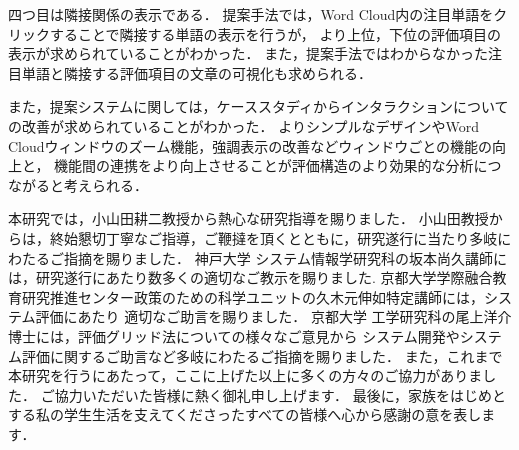 \documentclass[syuuron]{kuee}
\begin{document}
		四つ目は隣接関係の表示である．
		提案手法では，Word Cloud内の注目単語をクリックすることで隣接する単語の表示を行うが，
		より上位，下位の評価項目の表示が求められていることがわかった．
		また，提案手法ではわからなかった注目単語と隣接する評価項目の文章の可視化も求められる．
		
		また，提案システムに関しては，ケーススタディからインタラクションについての改善が求められていることがわかった．
		よりシンプルなデザインやWord Cloudウィンドウのズーム機能，強調表示の改善などウィンドウごとの機能の向上と，
		機能間の連携をより向上させることが評価構造のより効果的な分析につながると考えられる．

\begin{acknowledgements}
	本研究では，小山田耕二教授から熱心な研究指導を賜りました．
	小山田教授からは，終始懇切丁寧なご指導，ご鞭撻を頂くとともに，研究遂行に当たり多岐にわたるご指摘を賜りました．
	神戸大学 システム情報学研究科の坂本尚久講師には，研究遂行にあたり数多くの適切なご教示を賜りました.
	京都大学学際融合教育研究推進センター政策のための科学ユニットの久木元伸如特定講師には，システム評価にあたり
	適切なご助言を賜りました．
	京都大学 工学研究科の尾上洋介博士には，評価グリッド法についての様々なご意見から
	システム開発やシステム評価に関するご助言など多岐にわたるご指摘を賜りました．
	また，これまで本研究を行うにあたって，ここに上げた以上に多くの方々のご協力がありました．
	ご協力いただいた皆様に熱く御礼申し上げます．
	最後に，家族をはじめとする私の学生生活を支えてくださったすべての皆様へ心から感謝の意を表します．
\end{acknowledgements}
\end{document}
